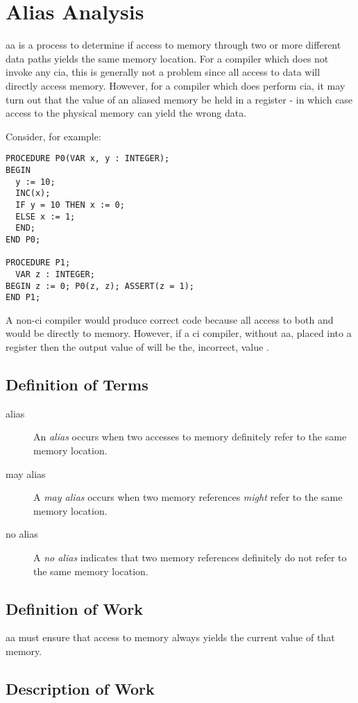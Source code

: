 \chapter{Alias Analysis}

\ac{aa} is a process to determine if access to memory through two or
more different data paths yields the same memory location.  For a
compiler which does not invoke any \ac{cia}, this is generally not a
problem since all access to data will directly access memory.
However, for a compiler which does perform \ac{cia}, it may turn out
that the value of an aliased memory be held in a register - in which
case access to the physical memory can yield the wrong data.

Consider, for example:

\begin{verbatim}
PROCEDURE P0(VAR x, y : INTEGER);
BEGIN
  y := 10;
  INC(x);
  IF y = 10 THEN x := 0;
  ELSE x := 1;
  END;
END P0;

PROCEDURE P1;
  VAR z : INTEGER;
BEGIN z := 0; P0(z, z); ASSERT(z = 1);
END P1;
\end{verbatim}

A non-\ac{ci} compiler would produce correct code because all access
to both  and  would be directly to memory.  However,
if a \ac{ci} compiler, without \ac{aa}, placed  into a
register then the output value of  will be the, incorrect,
value .

\section{Definition of Terms}
\begin{description}
\item[alias] An \emph{alias} occurs when two accesses to memory definitely
  refer to the same memory location.
\item[may alias] A \emph{may alias} occurs when two memory references
  \emph{might} refer to the same memory location.
\item[no alias] A \emph{no alias} indicates that two memory references
  definitely do not refer to the same memory location.
\end{description}

\section{Definition of Work}

\ac{aa} must ensure that access to memory always yields the current
value of that memory.

\section{Description of Work}


